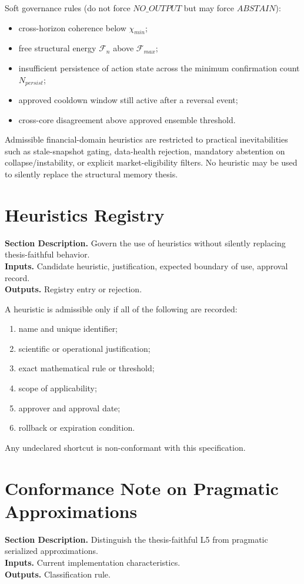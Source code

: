 \documentclass[11pt]{report}
\newcommand{\meta}[3]{\textbf{Section Description.} #1\\
\textbf{Inputs.} #2\\
\textbf{Outputs.} #3\par}
\begin{document}
Soft governance rules (do not force $NO\_OUTPUT$ but may force $ABSTAIN$):
\begin{itemize}
    \item cross-horizon coherence below $\chi_{min}$;
    \item free structural energy $\mathcal{F}_n$ above $\mathcal{F}_{max}$;
    \item insufficient persistence of action state across the minimum confirmation count $N_{persist}$;
    \item approved cooldown window still active after a reversal event;
    \item cross-core disagreement above approved ensemble threshold.
\end{itemize}

Admissible financial-domain heuristics are restricted to practical inevitabilities such as stale-snapshot gating, data-health rejection, mandatory abstention on collapse/instability, or explicit market-eligibility filters. No heuristic may be used to silently replace the structural memory thesis.

\section{Heuristics Registry}
\meta{Govern the use of heuristics without silently replacing thesis-faithful behavior.}{Candidate heuristic, justification, expected boundary of use, approval record.}{Registry entry or rejection.}

A heuristic is admissible only if all of the following are recorded:
\begin{enumerate}[leftmargin=1.2cm]
    \item name and unique identifier;
    \item scientific or operational justification;
    \item exact mathematical rule or threshold;
    \item scope of applicability;
    \item approver and approval date;
    \item rollback or expiration condition.
\end{enumerate}
Any undeclared shortcut is non-conformant with this specification.

\section{Conformance Note on Pragmatic Approximations}
\meta{Distinguish the thesis-faithful L5 from pragmatic serialized approximations.}{Current implementation characteristics.}{Classification rule.}
\end{document}
